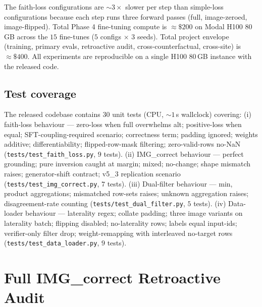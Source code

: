 \documentclass{article}
\begin{document}
The faith-loss configurations are $\sim 3\times$ slower per step than
simple-loss configurations because each step runs three forward passes
(full, image-zeroed, image-flipped). Total Phase 4 fine-tuning compute is
$\approx \$200$ on Modal H100 80\,GB across the $15$ fine-tunes
($5$ configs $\times$ $3$ seeds). Total project envelope (training,
primary evals, retroactive audit, cross-counterfactual, cross-site) is
$\approx \$400$. All experiments are reproducible on a single H100
$80$\,GB instance with the released code.

\subsection{Test coverage}
\label{app:tests}

The released codebase contains $30$ unit tests (CPU, $\sim 1$\,s
wallclock) covering: (i) faith-loss behaviour --- zero-loss when full
overwhelms alt; positive-loss when equal; SFT-coupling-required scenario;
correctness term; padding ignored; weights additive; differentiability;
flipped-row-mask filtering; zero-valid-rows no-NaN
(\texttt{tests/test\_faith\_loss.py}, $9$ tests). (ii) IMG\_correct
behaviour --- perfect grounding; pure inversion caught at margin; mixed;
no-change; shape mismatch raises; generator-shift contract; v5\_3
replication scenario (\texttt{tests/test\_img\_correct.py}, $7$ tests).
(iii) Dual-filter behaviour --- min, product aggregations; mismatched
row-sets raises; unknown aggregation raises; disagreement-rate counting
(\texttt{tests/test\_dual\_filter.py}, $5$ tests). (iv) Data-loader
behaviour --- laterality regex; collate padding; three image variants on
laterality batch; flipping disabled; no-laterality rows; labels equal
input-ids; verifier-only filter drop; weight-remapping with interleaved
no-target rows (\texttt{tests/test\_data\_loader.py}, $9$ tests).

\section{Full IMG\_correct Retroactive Audit}
\label{app:audit}
\end{document}
